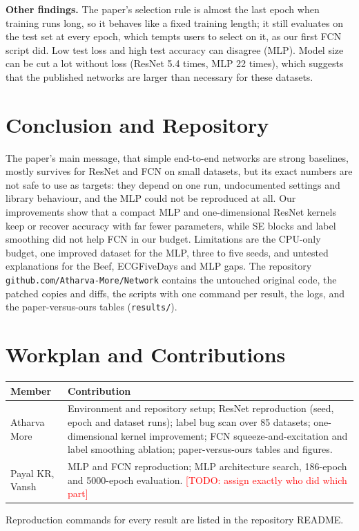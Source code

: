 \documentclass[conference]{IEEEtran}
\newcommand{\todo}[1]{\textcolor{red}{[TODO: #1]}}
\begin{document}
\textbf{Other findings.} The paper's selection rule is almost the last epoch when training runs long, so it behaves like a fixed training length; it still evaluates on the test set at every epoch, which tempts users to select on it, as our first FCN script did. Low test loss and high test accuracy can disagree (MLP). Model size can be cut a lot without loss (ResNet 5.4 times, MLP 22 times), which suggests that the published networks are larger than necessary for these datasets.

\section{Conclusion and Repository}
The paper's main message, that simple end-to-end networks are strong baselines, mostly survives for ResNet and FCN on small datasets, but its exact numbers are not safe to use as targets: they depend on one run, undocumented settings and library behaviour, and the MLP could not be reproduced at all. Our improvements show that a compact MLP and one-dimensional ResNet kernels keep or recover accuracy with far fewer parameters, while SE blocks and label smoothing did not help FCN in our budget. Limitations are the CPU-only budget, one improved dataset for the MLP, three to five seeds, and untested explanations for the Beef, ECGFiveDays and MLP gaps. The repository \texttt{github.com/Atharva-More/Network} contains the untouched original code, the patched copies and diffs, the scripts with one command per result, the logs, and the paper-versus-ours tables (\texttt{results/}).

\section*{Workplan and Contributions}
\begin{center}
\footnotesize
\setlength{\tabcolsep}{3pt}
\begin{tabular}{|p{2.0cm}|p{5.9cm}|}
\hline
\textbf{Member} & \textbf{Contribution} \\
\hline
Atharva More & Environment and repository setup; ResNet reproduction (seed, epoch and dataset runs); label bug scan over 85 datasets; one-dimensional kernel improvement; FCN squeeze-and-excitation and label smoothing ablation; paper-versus-ours tables and figures. \\
Payal KR, Vansh & MLP and FCN reproduction; MLP architecture search, 186-epoch and 5000-epoch evaluation. \todo{assign exactly who did which part} \\
\hline
\end{tabular}
\end{center}
Reproduction commands for every result are listed in the repository README.
\end{document}
